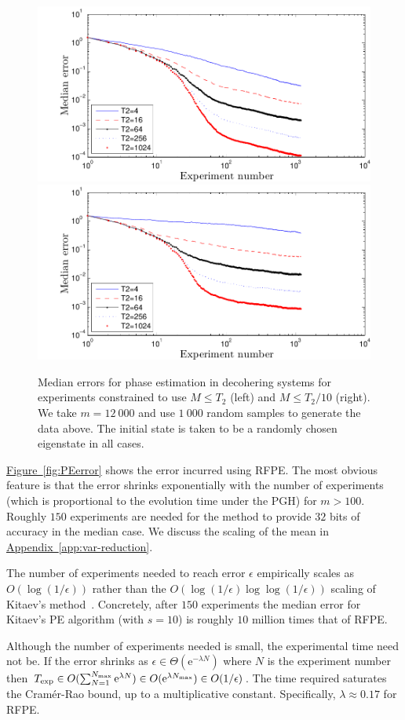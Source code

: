 \documentclass[aps,pra,amsmath,twocolumn,amssymb,superscriptaddress]{revtex4-1}
\newcommand{\app}[1]{\hyperref[app:#1]{Appendix~\ref*{app:#1}}}
\newcommand{\fig}[1]{\hyperref[fig:#1]{Figure~\ref*{fig:#1}}}
\newcommand{\ee}{\mathrm{e}}
\begin{document}
\begin{figure}
    \begin{centering}
\includegraphics[width=0.45\linewidth]{T2plot_full.pdf}
        \includegraphics[width=0.45\linewidth]{T2plot.pdf}
    \end{centering}
    \caption{\label{fig:T2plot}
Median errors for phase estimation in decohering systems for experiments constrained to use $M\le T_2$ (left) and $M\le T_2/10$ (right).  We take $m=12~000$ and use $1~000$ random samples to generate the data above.  The initial state is taken to be a randomly chosen eigenstate in all cases.
    }
\end{figure}

\fig{PEerror} shows the error incurred using RFPE.  The most obvious feature is that the error shrinks exponentially with the number of experiments (which is proportional to the evolution time under the PGH) for $m>100$.  Roughly $150$ experiments are needed for the method to provide $32$ bits of accuracy in the median case.
We discuss the scaling of the mean in \app{var-reduction}.

The number of experiments needed to reach error $\epsilon$ empirically scales as $O(\log(1/\epsilon))$ rather than the $O(\log(1/\epsilon)\log\log(1/\epsilon))$ scaling of Kitaev's method~\cite{Kit96,kitaev2002classical}.  Concretely, after $150$ experiments the median error for Kitaev's PE algorithm (with $s=10$) is roughly $10$ million times that of RFPE.

Although the number of experiments needed is small, the experimental time need
not be.  If the error shrinks as $\epsilon\in \Theta(\ee^{-\lambda N})$ where
$N$ is the experiment number then $T_{\exp}\in O(\sum_{N=1}^{N_{\max}} \ee^{\lambda N})\in O(\ee^{\lambda N_{\rm max}})\in O(1/\epsilon)$.  The
time required saturates the Cram\'er-Rao bound, up to a multiplicative constant.
Specifically, $\lambda\approx 0.17$ for RFPE.
\end{document}
